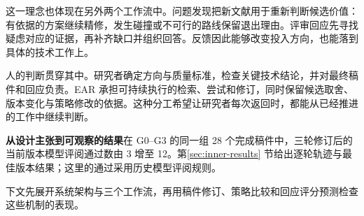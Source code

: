 这一理念也体现在另外两个工作流中。问题发现把新文献用于重新判断候选价值：有依据的方案继续精修，发生碰撞或不可行的路线保留退出理由。评审回应先寻找疑虑对应的证据，再补齐缺口并组织回答。反馈因此能够改变投入方向，也能落到具体的技术工作上。

人的判断贯穿其中。研究者确定方向与质量标准，检查关键技术结论，并对最终稿件和回应负责。EAR 承担可持续执行的检索、尝试和修订，同时保留候选取舍、版本变化与策略修改的依据。这种分工希望让研究者每次返回时，都能从已经推进的工作中继续判断。

\begin{insight}
\textbf{从设计主张到可观察的结果}\quad 在 G0--G3 的同一组 28 个完成稿件中，三轮修订后的当前版本模型评阅通过数由 3 增至 12。第\ref{sec:inner-results} 节给出逐轮轨迹与最佳版本结果；这里的通过采用历史模型评阅规则。
\end{insight}

下文先展开系统架构与三个工作流，再用稿件修订、策略比较和回应评分预测检查这些机制的表现。
